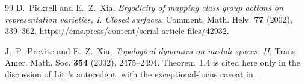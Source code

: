 \begin{thebibliography}{99}
D.~Pickrell and E.~Z.~Xia,
\emph{Ergodicity of mapping class group actions on representation varieties,
I. Closed surfaces}, Comment. Math. Helv. \textbf{77} (2002), 339--362.
\url{https://ems.press/content/serial-article-files/42932}.

J.~P.~Previte and E.~Z.~Xia,
\emph{Topological dynamics on moduli spaces. II},
Trans. Amer. Math. Soc. \textbf{354} (2002), 2475--2494.
Theorem~1.4 is cited here only in the discussion of Litt's antecedent,
with the exceptional-locus caveat in \cite{GT}.
\end{thebibliography}
